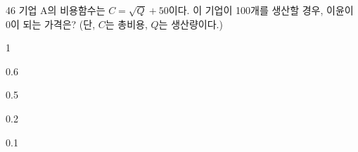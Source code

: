 \begin{question}{46}
기업 A의 비용함수는 $C=\sqrt{Q}+50$이다. 이 기업이 100개를 생산할 경우, 이윤이 0이 되는 가격은? (단, $C$는 총비용, $Q$는 생산량이다.)
\begin{choices}
  \item 1
  \item 0.6
  \item 0.5
  \item 0.2
  \item 0.1
\end{choices}
\end{question}
